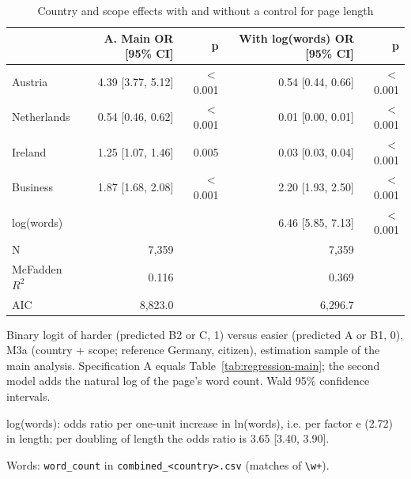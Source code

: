 \begin{table}[htbp]
\centering
\small
\begin{threeparttable}
\caption{Country and scope effects with and without a control for page length}
\label{tab:length-control}
\begin{tabular}{lrrrr}
\hline
 & A. Main OR [95\% CI] & p & With log(words) OR [95\% CI] & p \\
\hline
Austria & 4.39 [3.77, 5.12] & $<$0.001 & 0.54 [0.44, 0.66] & $<$0.001 \\
Netherlands & 0.54 [0.46, 0.62] & $<$0.001 & 0.01 [0.00, 0.01] & $<$0.001 \\
Ireland & 1.25 [1.07, 1.46] & 0.005 & 0.03 [0.03, 0.04] & $<$0.001 \\
Business & 1.87 [1.68, 2.08] & $<$0.001 & 2.20 [1.93, 2.50] & $<$0.001 \\
\hline
log(words) &  &  & 6.46 [5.85, 7.13] & $<$0.001 \\
\hline
N & 7,359 &  & 7,359 &  \\
McFadden $R^2$ & 0.116 &  & 0.369 &  \\
AIC & 8,823.0 &  & 6,296.7 &  \\
\hline
\end{tabular}
\begin{tablenotes}
\footnotesize
\item Binary logit of harder (predicted B2 or C, 1) versus easier (predicted A or B1, 0), M3a (country + scope; reference Germany, citizen), estimation sample of the main analysis. Specification A equals Table~\ref{tab:regression-main}; the second model adds the natural log of the page's word count. Wald 95\% confidence intervals.
\item log(words): odds ratio per one-unit increase in ln(words), i.e. per factor e (2.72) in length; per doubling of length the odds ratio is 3.65 [3.40, 3.90].
\item Words: \texttt{word\_count} in \texttt{combined\_<country>.csv} (matches of \texttt{\textbackslash w+}).
\end{tablenotes}
\end{threeparttable}
\end{table}
